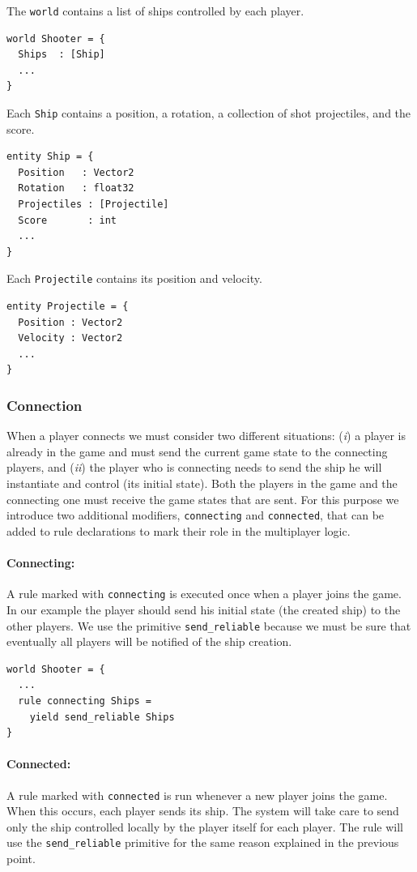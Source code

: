 The \texttt{world} contains a list of ships controlled by each player.
\begin{lstlisting}
world Shooter = {
  Ships  : [Ship]
  ...
}
\end{lstlisting}

Each \texttt{Ship} contains a position, a rotation, a collection of shot projectiles, and the score.
\begin{lstlisting}
entity Ship = {
  Position   : Vector2
  Rotation   : float32
  Projectiles : [Projectile]
  Score		  : int
  ...
}

\end{lstlisting}

Each \texttt{Projectile} contains its position and velocity.

\begin{lstlisting}
entity Projectile = {
  Position : Vector2
  Velocity : Vector2
  ...
}
\end{lstlisting}

\subsubsection{Connection}
When a player connects we must consider two different situations: (\textit{i}) a player is already in the game and must send the current game state to the connecting players, and (\textit{ii}) the player who is connecting needs to send the ship he will instantiate and control (its initial state). Both the players in the game and the connecting one must receive the game states that are sent. For this purpose we introduce two additional modifiers, \texttt{connecting} and \texttt{connected}, that can be added to rule declarations to mark their role in the multiplayer logic.

\paragraph{Connecting:} A rule marked with \texttt{connecting} is executed once when a player joins the game. In our example the player should send his initial state (the created ship) to the other players. We use the primitive \texttt{send\_reliable} because we must be sure that eventually all players will be notified of the ship creation.
	\begin{lstlisting}
world Shooter = {
  ...
  rule connecting Ships =
    yield send_reliable Ships
}
	\end{lstlisting}
	
\paragraph{Connected:} A rule marked with \texttt{connected} is run whenever a new player joins the game. When this occurs, each player sends its ship. The system will take care to send only the ship controlled locally by the player itself for each player. The rule will use the \texttt{send\_reliable} primitive for the same reason explained in the previous point.


